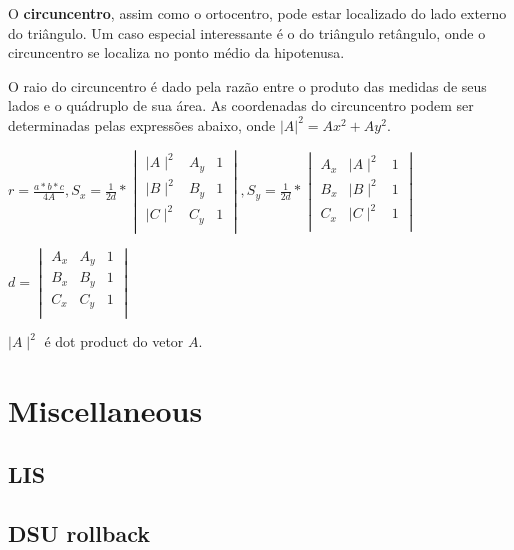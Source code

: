 \documentclass[a4paper,10pt,oneside]{article}
\newcommand\includes[2]{
   \subsection{#1}
   
}
\begin{document}
\begin{multicols}{2}
O \textbf{circuncentro}, assim como o ortocentro, pode estar localizado do lado externo do triângulo. Um caso especial interessante é o do triângulo retângulo, onde o circuncentro se localiza no ponto médio da hipotenusa.

O raio do circuncentro é dado pela razão entre o produto das medidas de seus lados e o quádruplo de sua área. As coordenadas do circuncentro podem ser determinadas pelas expressões abaixo, onde $|A|^2 = Ax^2 + Ay^2$.

$r = \frac{a*b*c}{4A}, S_x = \frac{1}{2d} * \begin{vmatrix}
\mid A\mid^2 & A_y & 1 \\
\mid B\mid^2 & B_y & 1 \\
\mid C\mid^2 & C_y & 1 \\
\end{vmatrix}, S_y = \frac{1}{2d} * \begin{vmatrix}
A_x & \mid A\mid^2 & 1 \\
B_x & \mid B\mid^2 & 1 \\
C_x & \mid C\mid^2 & 1 \\
\end{vmatrix}$

$d = \begin{vmatrix}
A_x & A_y & 1 \\
B_x & B_y & 1 \\
C_x & C_y & 1 \\
\end{vmatrix}$

$\mid A\mid^2$ é dot product do vetor $A$.

\section{Miscellaneous}
\includes{LIS}{code/misc/lis.cpp}
\includes{DSU rollback}{code/misc/bipar.cpp}

\end{multicols}
\end{document}
